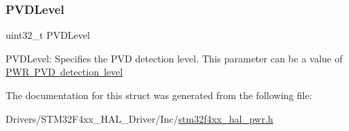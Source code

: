 \subsubsection{\texorpdfstring{P\+V\+D\+Level}{PVDLevel}}
{\footnotesize\ttfamily uint32\+\_\+t P\+V\+D\+Level}

P\+V\+D\+Level\+: Specifies the P\+VD detection level. This parameter can be a value of \mbox{\hyperlink{group___p_w_r___p_v_d__detection__level}{P\+WR P\+VD detection level}} 

The documentation for this struct was generated from the following file\+:\begin{DoxyCompactItemize}
\item 
Drivers/\+S\+T\+M32\+F4xx\+\_\+\+H\+A\+L\+\_\+\+Driver/\+Inc/\mbox{\hyperlink{stm32f4xx__hal__pwr_8h}{stm32f4xx\+\_\+hal\+\_\+pwr.\+h}}\end{DoxyCompactItemize}
